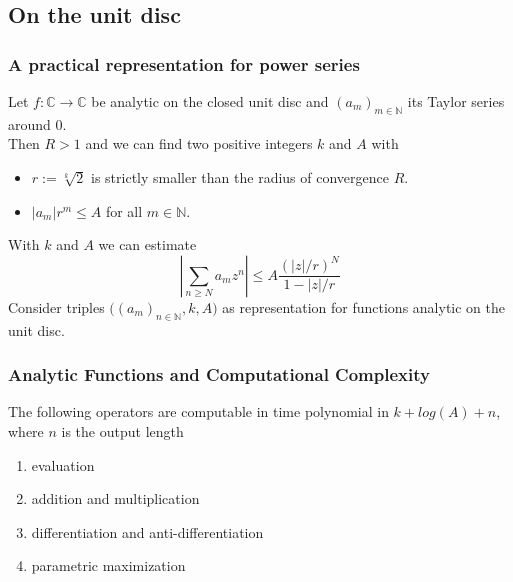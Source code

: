 \documentclass[xcolor=pdftex,dvipsnames,table]{beamer}
\newcommand{\N}{\ensuremath{\mathbb{N}}}
\newcommand{\C}{\ensuremath{\mathbb{C}}}
\begin{document}
\subsection{On the unit disc}
\begin{frame}
\frametitle{A practical representation for power series}
\begin{lemma}
Let $f : \C \to \C$ be analytic on the closed unit disc and $(a_m)_{m\in\N}$ its Taylor series around $0$.\\
Then $R>1$ \pause and we can find two positive integers $k$ and $A$ with 
\begin{itemize}
\item $r := \sqrt[k]{2}$ is strictly smaller than the radius of convergence $R$.
\item $|a_m|r^m \leq A$ for all $m \in \N$.
\end{itemize}
\end{lemma}
\pause
With $k$ and $A$ we can estimate 
$$ \left | \sum_{n \geq N} a_m z^n \right | \leq A\frac{(|z|/r)^N}{1-|z|/r} $$\pause
Consider triples $\big((a_m)_{n \in \N}, k, A\big)$ as representation for functions analytic on the unit disc.
\end{frame}
\begin{frame}[<+->]
\frametitle{Analytic Functions and Computational Complexity}
\begin{theorem}
The following operators are computable in time polynomial in $k+log(A)+n$, where $n$ is the output length
\begin{enumerate}
\item evaluation
\item addition and multiplication
\item differentiation and anti-differentiation
\item parametric maximization
\end{enumerate}
\end{theorem}
\end{frame}
\end{document}
